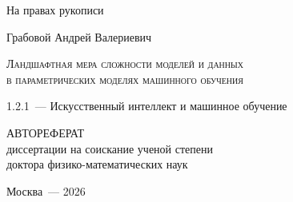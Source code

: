 \documentclass{dissert}
\begin{document}
\begin{titlepage}
\begin{flushright}
{На правах рукописи}
\end{flushright}
\vspace{1.5cm}
\begin{center}
{Грабовой Андрей Валериевич}
\par
\vspace{2cm}
\textsc{Ландшафтная мера сложности моделей и данных \\в параметрических моделях машинного обучения}
\par
\vspace{2cm}
{1.2.1~--- Искусственный интеллект и машинное обучение}
\par
\vspace{2cm}
{АВТОРЕФЕРАТ\\
диссертации на соискание ученой степени\\
доктора физико-математических наук}
\end{center}
\par
\vspace{3.5cm}
\begin{center}
{Москва~--- 2026}
\end{center}
\end{titlepage}
\end{document}
